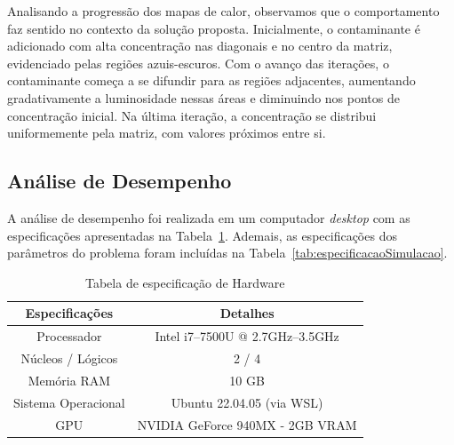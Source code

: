 \documentclass[12pt]{article}
\begin{document}
Analisando a progressão dos mapas de calor, observamos que o comportamento faz
sentido no contexto da solução proposta. Inicialmente, o contaminante é
adicionado com alta concentração nas diagonais e no centro da matriz,
evidenciado pelas regiões azuis-escuros. Com o avanço das iterações, o
contaminante começa a se difundir para as regiões adjacentes, aumentando
gradativamente a luminosidade nessas áreas e diminuindo nos pontos de
concentração inicial. Na última iteração, a concentração se distribui
uniformemente pela matriz, com valores próximos entre si.

\subsection{Análise de Desempenho}

A análise de desempenho foi realizada em um computador \textit{desktop} com as
especificações apresentadas na Tabela~\ref{tab:especificacaoHardware}. Ademais,
as especificações dos parâmetros do problema foram incluídas na
Tabela~\ref{tab:especificacaoSimulacao}.

\begin{table}[ht]
  \centering
  \caption{Tabela de especificação de Hardware}
  \vspace{0.3cm}
  \begin{tabular}{||c c||}
    \hline
    Especificações      & Detalhes                         \\ [0.5ex]
    \hline\hline
    Processador         & Intel i7--7500U @ 2.7GHz--3.5GHz \\
    \hline
    Núcleos / Lógicos   & 2 / 4                            \\
    \hline
    Memória RAM         & 10 GB                            \\
    \hline
    Sistema Operacional & Ubuntu 22.04.05 (via WSL)        \\
    \hline
    GPU                 & NVIDIA GeForce 940MX - 2GB VRAM  \\
    \hline
  \end{tabular}\label{tab:especificacaoHardware}
\end{table}
\end{document}
